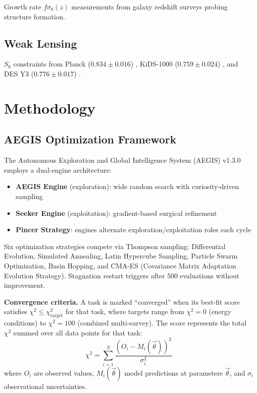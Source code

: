 \documentclass[twocolumn,prd,superscriptaddress,nofootinbib]{revtex4-2}
\begin{document}
Growth rate $f\sigma_8(z)$ measurements from galaxy redshift surveys probing structure formation.

\subsection{Weak Lensing}

$S_8$ constraints from Planck ($0.834 \pm 0.016$) \cite{Planck2020}, KiDS-1000 ($0.759 \pm 0.024$) \cite{KiDS2021}, and DES Y3 ($0.776 \pm 0.017$) \cite{DESY3}.

\section{Methodology}
\label{sec:methods}

\subsection{AEGIS Optimization Framework}

The Autonomous Exploration and Global Intelligence System (AEGIS) v1.3.0 employs a dual-engine architecture:

\begin{itemize}
\item \textbf{AEGIS Engine} (exploration): wide random search with curiosity-driven sampling
\item \textbf{Seeker Engine} (exploitation): gradient-based surgical refinement
\item \textbf{Pincer Strategy}: engines alternate exploration/exploitation roles each cycle
\end{itemize}

Six optimization strategies compete via Thompson sampling: Differential Evolution, Simulated Annealing, Latin Hypercube Sampling, Particle Swarm Optimization, Basin Hopping, and CMA-ES (Covariance Matrix Adaptation Evolution Strategy). Stagnation restart triggers after 500 evaluations without improvement.

\textbf{Convergence criteria.} A task is marked ``converged'' when its best-fit score satisfies $\chi^2 \leq \chi^2_\text{target}$ for that task, where targets range from $\chi^2 = 0$ (energy conditions) to $\chi^2 = 100$ (combined multi-survey). The score represents the total $\chi^2$ summed over all data points for that task:
\begin{equation}
\chi^2 = \sum_{i=1}^{N} \frac{(O_i - M_i(\vec{\theta}))^2}{\sigma_i^2}
\label{eq:chi2}
\end{equation}
where $O_i$ are observed values, $M_i(\vec{\theta})$ model predictions at parameters $\vec{\theta}$, and $\sigma_i$ observational uncertainties.
\end{document}
